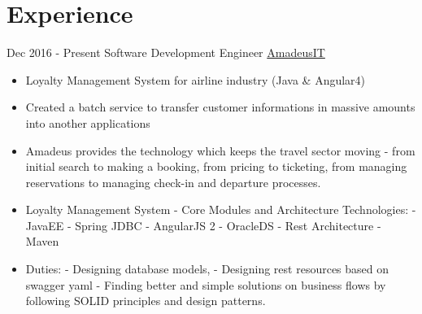 \documentclass[letterpaper]{twentysecondcv} %
\begin{document}

\section{Experience}

\begin{twenty} %
    \twentyitem
    	{Dec 2016 -}
		{Present}
        {Software Development Engineer}
        {\href{http://www.amadeus.com/}{AmadeusIT}}
        {}
        {\begin{itemize}
        \item Loyalty Management System for airline industry (Java \& Angular4)
        \item Created a batch service to transfer customer informations in massive amounts into another applications
        \item Amadeus provides the technology which keeps the travel sector moving - from initial search to making a booking, from pricing to ticketing, from managing reservations to managing check-in and departure processes.
        \item Loyalty Management System - Core Modules and Architecture
            Technologies:
            - JavaEE
            - Spring JDBC
            - AngularJS 2
            - OracleDS
            - Rest Architecture
            - Maven
        \item Duties:
            - Designing database models,
            - Designing rest resources based on swagger yaml 
            - Finding better and simple solutions on business flows by following SOLID principles and design patterns.


\end{itemize}}
\end{twenty}
\end{document}
